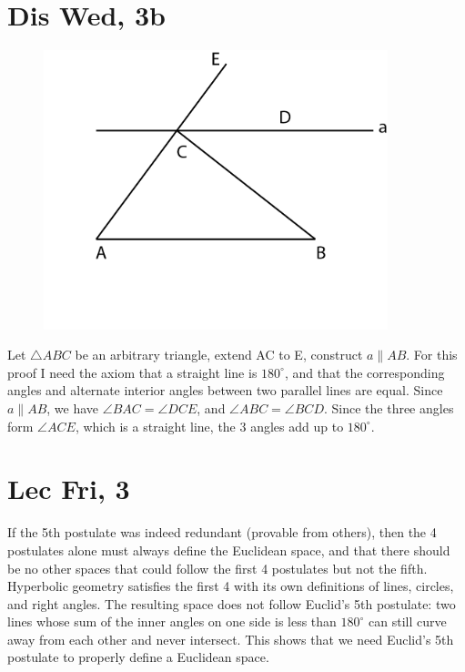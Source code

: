 \documentclass[12pt]{article}
\newcommand{\degrees}{^{\circ}}
\begin{document}
\section{Dis Wed, 3b}
\begin{figure}[h]
    \includegraphics[width = 100mm]{GRAPH6.png}
\end{figure}
Let $\triangle ABC$ be an arbitrary triangle, extend AC to E, construct $a \parallel AB$.
\newline
For this proof I need the axiom that a straight line is $180 \degrees$, and that the corresponding angles and alternate interior angles between two parallel lines are equal.
\newline
Since $a \parallel AB$, we have $\angle BAC = \angle DCE$, and $\angle ABC = \angle BCD$. Since the three angles form $\angle ACE$, which is a straight line, the 3 angles add up to $180 \degrees$.
\newpage


\section{Lec Fri, 3}
If the 5th postulate was indeed redundant (provable from others), then the 4 postulates alone must always define the Euclidean space, and that there should be no other spaces that could follow the first 4 postulates but not the fifth.
\newline
Hyperbolic geometry satisfies the first 4 with its own definitions of lines, circles, and right angles. The resulting space does not follow Euclid's 5th postulate: two lines whose sum of the inner angles on one side is less than $180 \degrees$ can still curve away from each other and never intersect.
\newline
This shows that we need Euclid's 5th postulate to properly define a Euclidean space.
\newpage
\end{document}

